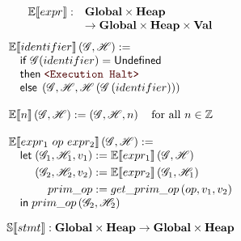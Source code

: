 \begin{figure}

\begin{minipage}{.46\textwidth}
\[\begin{array}{rl}
  \mathbb{E}\!\left\llbracket expr \right\rrbracket :& \mathbf{Global} \times \mathbf{Heap} \\
  &\to \mathbf{Global} \times \mathbf{Heap} \times \mathbf{Val} \\
\end{array}\]
\[
  \begin{array}{l}
    \Ctx{E}{identifier}\left(\Glo, \Hea\right) := \\
    \quad \ifm \Glo(identifier) = \undefm \\
    \quad \thenm \Halt \\
    \quad \elsem \left(\Glo, \Hea, \Hea\left(\Glo\left(identifier\right)\right)\right) \\
    \\
    \Ctx{E}{n}\left(\Glo, \Hea\right) := \left(\Glo, \Hea, n\right) \quad \text{for all } n \in \mathbb{Z}\\
    \\
    \Ctx{E}{expr_1~op~expr_2}\left(\Glo, \Hea\right) := \\
    \quad \letm
    \begin{aligned}[t]
       \left(\Glo_1, \Hea_1, v_1\right) &:= \Ctx{E}{expr_1}\left(\Glo, \Hea\right) \\
       \left(\Glo_2, \Hea_2, v_2\right) &:= \Ctx{E}{expr_2}\left(\Glo_1, \Hea_1\right) \\
       prim\_op &:= get\_prim\_op\left(op, v_1, v_2\right) \\
    \end{aligned} \\
    \quad \inm prim\_op\left(\Glo_2, \Hea_2\right)
  \end{array}
\]
\end{minipage}%
\hfill%
\begin{minipage}{.46\textwidth}
\[\mathbb{S}\!\left\llbracket stmt \right\rrbracket : \mathbf{Global} \times \mathbf{Heap} \to \mathbf{Global} \times \mathbf{Heap} \\\]


\end{minipage}
\end{figure}
